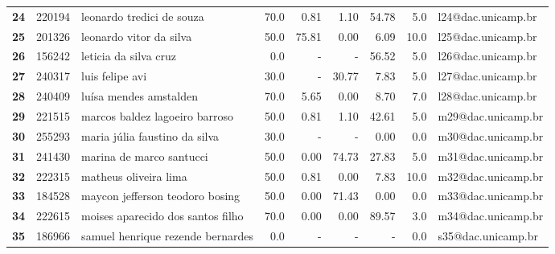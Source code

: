 \documentclass[11pt]{article}
\begin{document}
\begin{center}
\begin{landscape}
\begin{longtable}{lllrrrrrl}
\textbf{24    } &  220194 &             leonardo tredici de souza &                  70.0 &        0.81 &        1.10 &       54.78 &                      5.0 &  l24@dac.unicamp.br \\
\textbf{25    } &  201326 &               leonardo vitor da silva &                  50.0 &       75.81 &        0.00 &        6.09 &                     10.0 &  l25@dac.unicamp.br \\
\textbf{26    } &  156242 &                 leticia da silva cruz &                   0.0 &           - &           - &       56.52 &                      5.0 &  l26@dac.unicamp.br \\
\textbf{27    } &  240317 &                       luis felipe avi &                  30.0 &           - &       30.77 &        7.83 &                      5.0 &  l27@dac.unicamp.br \\
\textbf{28    } &  240409 &                luísa mendes amstalden &                  70.0 &        5.65 &        0.00 &        8.70 &                      7.0 &  l28@dac.unicamp.br \\
\textbf{29    } &  221515 &        marcos baldez lagoeiro barroso &                  50.0 &        0.81 &        1.10 &       42.61 &                      5.0 &  m29@dac.unicamp.br \\
\textbf{30    } &  255293 &         maria júlia faustino da silva &                  30.0 &           - &           - &        0.00 &                      0.0 &  m30@dac.unicamp.br \\
\textbf{31    } &  241430 &              marina de marco santucci &                  50.0 &        0.00 &       74.73 &       27.83 &                      5.0 &  m31@dac.unicamp.br \\
\textbf{32    } &  222315 &                 matheus oliveira lima &                  50.0 &        0.81 &        0.00 &        7.83 &                     10.0 &  m32@dac.unicamp.br \\
\textbf{33    } &  184528 &       maycon jefferson teodoro bosing &                  50.0 &        0.00 &       71.43 &        0.00 &                      0.0 &  m33@dac.unicamp.br \\
\textbf{34    } &  222615 &     moises aparecido dos santos filho &                  70.0 &        0.00 &        0.00 &       89.57 &                      3.0 &  m34@dac.unicamp.br \\
\textbf{35    } &  186966 &     samuel henrique rezende bernardes &                   0.0 &           - &           - &           - &                      0.0 &  s35@dac.unicamp.br \\

\end{longtable}
\end{landscape}
\end{center}
\end{document}
